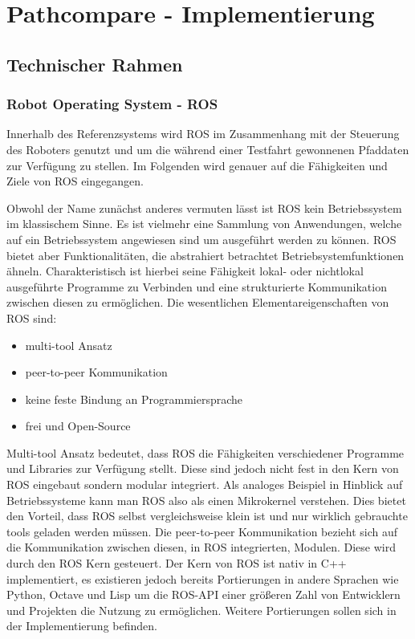 \chapter{Pathcompare - Implementierung}
\label{sec:implementierung}
\section{Technischer Rahmen}

\subsection{Robot Operating System - ROS}

Innerhalb des Referenzsystems wird \gls{ROS} im Zusammenhang mit der Steuerung
des Roboters genutzt und um die während einer Testfahrt gewonnenen Pfaddaten
zur Verfügung zu stellen. Im Folgenden wird genauer auf die Fähigkeiten und
Ziele von \gls{ROS} eingegangen.

Obwohl der Name zunächst anderes vermuten lässt ist \gls{ROS} kein
Betriebssystem im klassischem Sinne. Es ist vielmehr eine Sammlung von
Anwendungen, welche auf ein Betriebssystem angewiesen sind um ausgeführt werden
zu können. ROS bietet aber Funktionalitäten, die abstrahiert betrachtet
Betriebsystemfunktionen ähneln. Charakteristisch ist hierbei seine Fähigkeit
lokal- oder nichtlokal ausgeführte Programme zu Verbinden und eine
strukturierte Kommunikation zwischen diesen zu ermöglichen. Die wesentlichen
Elementareigenschaften von ROS sind:

\begin{itemize}
  \item multi-tool Ansatz
  \item peer-to-peer Kommunikation
  \item keine feste Bindung an Programmiersprache
  \item frei und Open-Source
\end{itemize}

Multi-tool Ansatz bedeutet, dass \gls{ROS} die Fähigkeiten verschiedener
Programme und Libraries zur Verfügung stellt. Diese sind jedoch nicht fest in
den Kern von \gls{ROS} eingebaut sondern modular integriert. Als analoges
Beispiel in Hinblick auf Betriebssysteme kann man \gls{ROS} also als einen
Mikrokernel verstehen. Dies bietet den Vorteil, dass \gls{ROS} selbst
vergleichsweise klein ist und nur wirklich gebrauchte tools geladen werden
müssen.  Die peer-to-peer Kommunikation bezieht sich auf die Kommunikation
zwischen diesen, in \gls{ROS} integrierten, Modulen. Diese wird durch den
\gls{ROS} Kern gesteuert. Der Kern von \gls{ROS} ist nativ in C++
implementiert, es existieren jedoch bereits Portierungen in andere Sprachen wie
Python, Octave und Lisp um die \gls{ROS}-\gls{API} einer größeren Zahl von
Entwicklern und Projekten die Nutzung zu ermöglichen. Weitere Portierungen
sollen sich in der Implementierung befinden.

